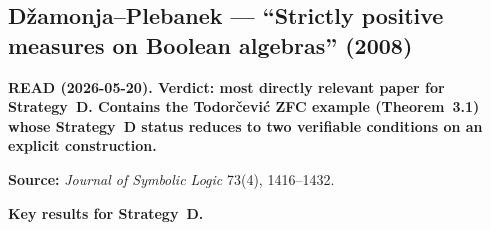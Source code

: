 \subsection*{D\v{z}amonja--Plebanek --- ``Strictly positive measures
  on Boolean algebras'' (2008)}

\textbf{READ (2026-05-20).  Verdict: most directly relevant paper
for Strategy~D.  Contains the Todor\v{c}evi\'{c} ZFC example
(Theorem~3.1) whose Strategy~D status reduces to two verifiable
conditions on an explicit construction.}

\medskip\noindent
\textbf{Source:} \emph{Journal of Symbolic Logic} 73(4), 1416--1432.

\medskip\noindent
\textbf{Key results for Strategy~D.}

